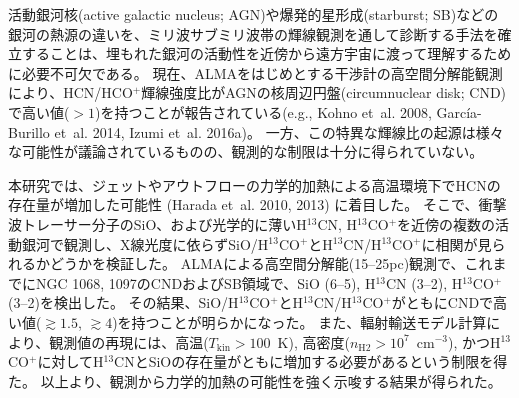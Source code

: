 \documentclass[ja]{2019b}
\begin{document}
活動銀河核(active galactic nucleus; AGN)や爆発的星形成(starburst; SB)などの銀河の熱源の違いを、ミリ波サブミリ波帯の輝線観測を通して診断する手法を確立することは、埋もれた銀河の活動性を近傍から遠方宇宙に渡って理解するために必要不可欠である。
現在、ALMAをはじめとする干渉計の高空間分解能観測により、HCN/HCO$^{+}$輝線強度比がAGNの核周辺円盤(circumnuclear disk; CND)で高い値($>1$)を持つことが報告されている(e.g., Kohno et~al. 2008, Garc\'{i}a-Burillo et~al. 2014, Izumi et~al. 2016a)。
一方、この特異な輝線比の起源は様々な可能性が議論されているものの、観測的な制限は十分に得られていない。

本研究では、ジェットやアウトフローの力学的加熱による高温環境下でHCNの存在量が増加した可能性 (Harada et~al. 2010, 2013) に着目した。
そこで、衝撃波トレーサー分子のSiO、および光学的に薄いH$^{13}$CN, H$^{13}$CO$^{+}$を近傍の複数の活動銀河で観測し、X線光度に依らずSiO/H$^{13}$CO$^{+}$とH$^{13}$CN/H$^{13}$CO$^{+}$に相関が見られるかどうかを検証した。
ALMAによる高空間分解能(15--25pc)観測で、これまでにNGC 1068, 1097のCNDおよびSB領域で、SiO (6--5), H$^{13}$CN (3--2), H$^{13}$CO$^{+}$ (3--2)を検出した。
その結果、SiO/H$^{13}$CO$^{+}$とH$^{13}$CN/H$^{13}$CO$^{+}$がともにCNDで高い値($\gtrsim1.5$, $\gtrsim4$)を持つことが明らかになった。
また、輻射輸送モデル計算により、観測値の再現には、高温($T_{\mathrm{kin}}>100$~K), 高密度($n_{\mathrm{H2}}>10^{7}$~cm$^{-3}$), かつH$^{13}$CO$^{+}$に対してH$^{13}$CNとSiOの存在量がともに増加する必要があるという制限を得た。
以上より、観測から力学的加熱の可能性を強く示唆する結果が得られた。
\end{document}
